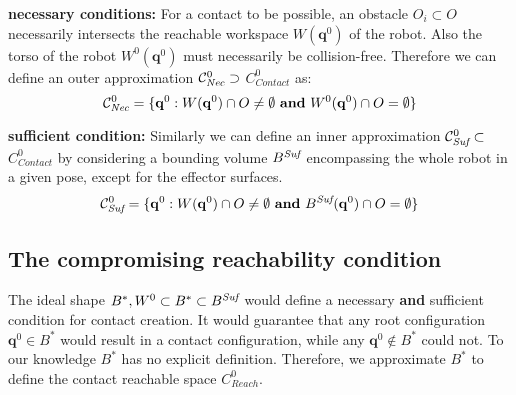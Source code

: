 \textbf{necessary conditions:}
For a contact to be possible, an obstacle $O_i \subset O$ necessarily intersects the reachable workspace $W(\mathbf{q}^{0})$ of the robot. %
 Also the torso of the robot $W^0(\mathbf{q}^{0})$ must necessarily be collision-free.
Therefore we can define an outer approximation  $ \mathcal{C}^0_{\textrm{\it Nec}} \supset$ $C_{Contact}^0$ as: 
\begin{equation}
\mathcal{C}^0_{\textrm{\it Nec}} = \{ \mathbf{q}^0 : W(\mathbf{q}^{0}) \cap O \neq \emptyset \textrm{ \textbf{and}}\ W^0(\mathbf{q}^{0}) \cap O = \emptyset \} %
\end{equation}
 

\textbf{sufficient condition:}
Similarly we can define an inner approximation \mbox{$\mathcal{C}^0_{\textrm{\it Suf}} \subset $ $C_{Contact}^0$} by considering a bounding volume $B^{\textrm{\it Suf}}$ encompassing the whole robot in a given pose, except for the effector surfaces. 
\begin{equation}
\mathcal{C}^0_{\textrm{\it Suf}} = \{ \mathbf{q}^0 : W(\mathbf{q}^{0}) \cap O \neq \emptyset \textrm{ \textbf{and}}\ B^{\textrm{\it Suf}}(\mathbf{q}^{0}) \cap O = \emptyset \} %
\end{equation}


\subsection{The compromising reachability condition}
\label{sec:scaling}
The ideal shape $B^*, W^0 \subset B^* \subset B^{\textrm{\it Suf}}$ would define a necessary \textbf{and} sufficient condition for contact creation. 
It would guarantee that any root configuration $\mathbf{q}^{0} \in B^*$ would result in a contact configuration, while any $\mathbf{q}^{0} \notin B^*$ could not.
To our knowledge  $B^*$ has no explicit definition.
Therefore, we approximate $B^*$ to define the contact reachable space $C_{Reach}^0$.

